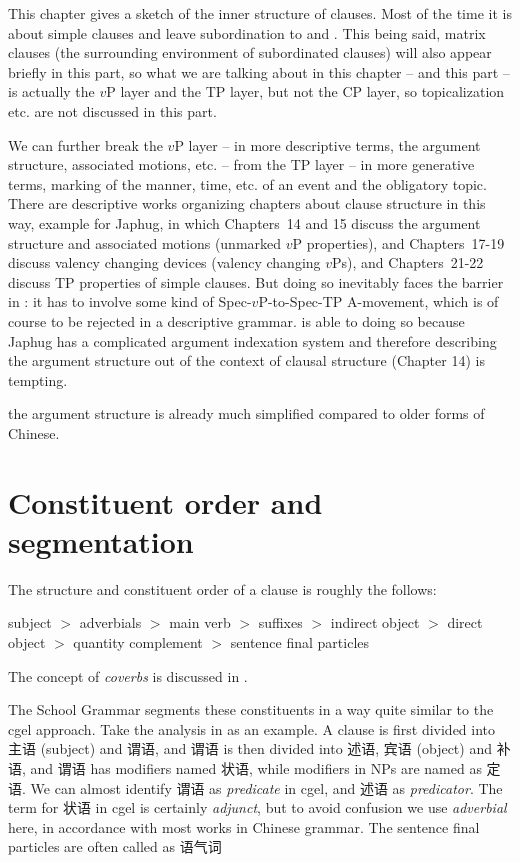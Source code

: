 \documentclass[../main.tex]{subfiles}
\begin{document}
This chapter gives a sketch of the inner structure of clauses.
Most of the time it is about simple clauses and leave subordination to 
 and .
This being said, matrix clauses (the surrounding environment of subordinated clauses)
will also appear briefly in this part, so what we are talking about in this chapter -- and this part -- is 
actually the $v$P layer and the TP layer, but not the CP layer, so topicalization etc. are not 
discussed in this part. 

We can further break the $v$P layer -- in more descriptive terms, the argument 
structure, associated motions, etc.
-- from the TP layer -- in more generative terms, marking of the manner, time, etc. of an event and the
obligatory topic. There are descriptive works organizing chapters about clause structure in this way, 
example \citet{jacques2021grammar} for Japhug, in which Chapters~14 and 15 discuss the argument structure 
and associated motions (unmarked $v$P properties), and Chapters~17-19 discuss valency changing devices 
(valency changing $v$Ps), and Chapters~21-22 discuss TP properties of simple clauses. 
But doing so inevitably faces the barrier in : 
it has to involve some kind of Spec-$v$P-to-Spec-TP A-movement, 
which is of course to be rejected in a descriptive grammar. 
\citet{jacques2021grammar} is able to doing so 
because Japhug has a complicated argument indexation system 
and therefore describing the argument structure out of the context of clausal structure (Chapter 14) is tempting.

the argument structure is already much simplified compared to older forms of Chinese.

\section{Constituent order and segmentation}

The structure and constituent order of a clause is roughly the follows:
\begin{exe}
    \ex\label{ex:clause-order} subject $>$ adverbials $>$ main verb $>$ suffixes $>$ indirect object $>$ direct object $>$ quantity complement $>$ sentence final particles
\end{exe}
The concept of \emph{coverbs} is discussed in .

The School Grammar segments these constituents in a way quite similar to the \ac{cgel} approach. 
Take the analysis in \citet[Chapter 5]{xianhan2004} as an example.
A clause is first divided into 主语 (subject) and 谓语, and 谓语 is then divided into 述语, 宾语 (object) and 补语,
and 谓语 has modifiers named 状语, while modifiers in NPs are named as 定语. We can almost identify 
谓语 as \emph{predicate} in \ac{cgel}, and 述语 as \emph{predicator}. 
The term for 状语 in \ac{cgel} is certainly \emph{adjunct}, but to avoid confusion we use \emph{adverbial}
here, in accordance with most works in Chinese grammar. 
The sentence final particles are often called as 语气词 %
\end{document}

